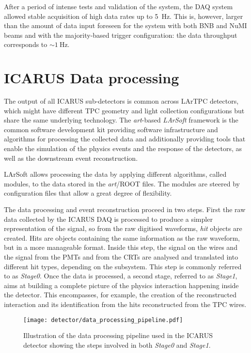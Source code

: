 After a period of intense tests and validation of the system, the DAQ system allowed stable acquisition of high data rates up to \SI{5}{\hertz}. This is, however, larger than the amount of data input foreseen for the system with both BNB and NuMI beams and with the majority-based trigger configuration: the data throughput corresponds to ${\sim}\SI{1}{\hertz}$.

\section{ICARUS Data processing}

The output of all ICARUS sub-detectors is common across LArTPC detectors, which might have different TPC geometry and light collection configurations but share the same underlying technology. The \emph{art}-based \emph{LArSoft} framework \cite{Church:2013hea,Snider:2017wjd,Pordes:2017BL} is the common software development kit providing software infrastructure and algorithms for processing the collected data and additionally providing tools that enable the simulation of the physics events and the response of the detectors, as well as the downstream event reconstruction. 

LArSoft allows processing the data by applying different algorithms, called modules, to the data stored in the \emph{art}/ROOT files. The modules are steered by configuration files that allow a great degree of flexibility. 

The data processing and event reconstruction proceed in two steps. First the raw data collected by the ICARUS DAQ is processed to produce a simpler representation of the signal, so from the raw digitised waveforms, \emph{hit} objects are created. Hits are objects containing the same information as the raw waveform, but in a more manageable format. Inside this step, the signal on the wires and the signal from the PMTs and from the CRTs are analysed and translated into different hit types, depending on the subsystem. This step is commonly referred to as \emph{Stage0}. Once the data is processed, a second stage, referred to as \emph{Stage1}, aims at building a complete picture of the physics interaction happening inside the detector. This encompasses, for example, the creation of the reconstructed interaction and its identification from the hits reconstructed from the TPC wires. 

\begin{figure}
    \centering
    \texttt{[image: detector/data\_processing\_pipeline.pdf]}
    \caption[\emph{Stage0} and \emph{Stage1} data processing pipeline]{Illustration of the data processing pipeline used in the ICARUS detector showing the steps involved in both \emph{Stage0} and \emph{Stage1}. }
    \label{fig:reco_stages}
\end{figure}

